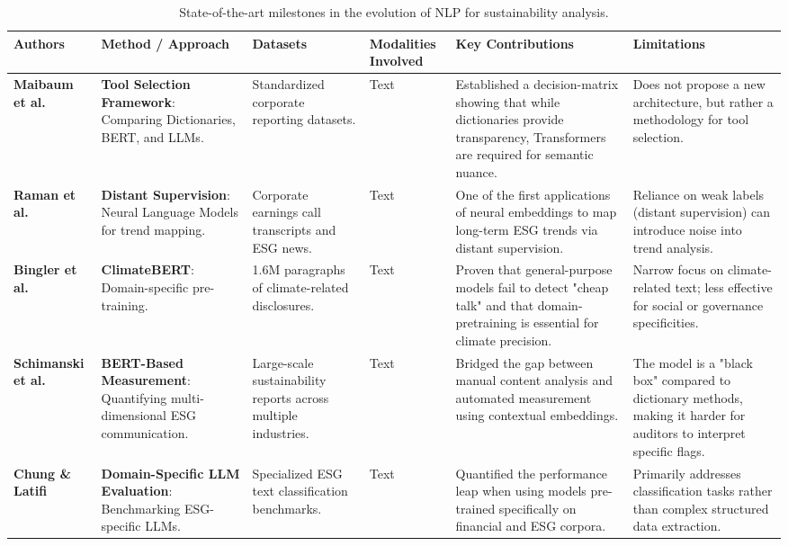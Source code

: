 \begin{landscape}
\begin{table}[p]
\centering
\caption{State-of-the-art milestones in the evolution of NLP for sustainability analysis.}
\label{tab:relatedwork-nlp-evolution-a}
\small
\renewcommand{\arraystretch}{1.2}
\begin{tabularx}{\linewidth}{|p{1.8cm}|p{3.5cm}|p{3cm}|p{1.8cm}|X|X|}
\hline
Authors & Method / Approach & Datasets & Modalities Involved & Key Contributions & Limitations \\ \hline
\textbf{Maibaum et al.}  \parencite{frederik_maibaum_b8629037} & \textbf{Tool Selection Framework}: Comparing Dictionaries, BERT, and LLMs. & Standardized corporate reporting datasets. & Text & Established a decision-matrix showing that while dictionaries provide transparency, Transformers are required for semantic nuance. & Does not propose a new architecture, but rather a methodology for tool selection. \\ \hline
\textbf{Raman et al.}  \parencite{natraj_raman_009776f2} & \textbf{Distant Supervision}: Neural Language Models for trend mapping. & Corporate earnings call transcripts and ESG news. & Text & One of the first applications of neural embeddings to map long-term ESG trends via distant supervision. & Reliance on weak labels (distant supervision) can introduce noise into trend analysis. \\ \hline
\textbf{Bingler et al.}  \parencite{julia_bingler_268445e3} & \textbf{ClimateBERT}: Domain-specific pre-training. & 1.6M paragraphs of climate-related disclosures. & Text & Proven that general-purpose models fail to detect "cheap talk" and that domain-pretraining is essential for climate precision. & Narrow focus on climate-related text; less effective for social or governance specificities. \\ \hline
\textbf{Schimanski et al.}  \parencite{tobias_schimanski_4e192ec5} & \textbf{BERT-Based Measurement}: Quantifying multi-dimensional ESG communication. & Large-scale sustainability reports across multiple industries. & Text & Bridged the gap between manual content analysis and automated measurement using contextual embeddings. & The model is a "black box" compared to dictionary methods, making it harder for auditors to interpret specific flags. \\ \hline
\textbf{Chung \& Latifi}  \parencite{tae_sun_chung_e16a4c18} & \textbf{Domain-Specific LLM Evaluation}: Benchmarking ESG-specific LLMs. & Specialized ESG text classification benchmarks. & Text & Quantified the performance leap when using models pre-trained specifically on financial and ESG corpora. & Primarily addresses classification tasks rather than complex structured data extraction. \\ \hline

\end{tabularx}
\end{table}
\end{landscape}
